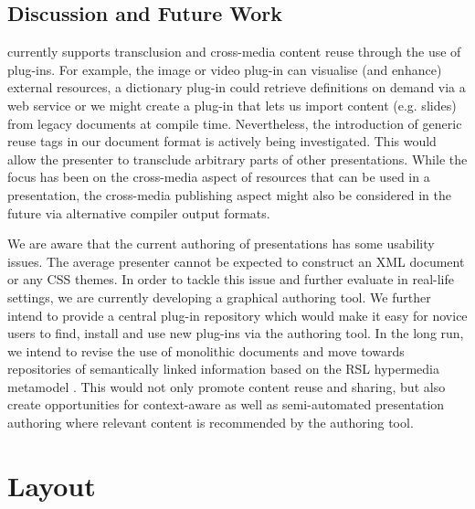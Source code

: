    \subsection{Discussion and Future Work}

    \mxp currently supports transclusion and cross-media content reuse through
    the use of plug-ins. For example, the image or video plug-in can visualise
    (and enhance) external resources, a dictionary plug-in could retrieve
    definitions on demand via a web service or we might create a plug-in that
    lets us import content (e.g. \ppt slides) from legacy documents at compile
    time. Nevertheless, the introduction of generic reuse tags in our document
    format is actively being investigated. This would allow the presenter to
    transclude arbitrary parts of other \mxp presentations. While the focus has
    been on the cross-media aspect of resources that can be used in a
    presentation, the cross-media publishing aspect might also be considered in
    the future via alternative compiler output formats.

    We are aware that the current authoring of \mxp presentations has some
    usability issues. The average presenter cannot be expected to construct an
    XML document or any CSS themes. In order to tackle this issue and further
    evaluate \mxp in real-life settings, we are currently developing a
    graphical \mxp authoring tool. We further intend to provide a central
    plug-in repository which would make it easy for novice users to find,
    install and use new plug-ins via the authoring tool. In the long run, we
    intend to revise the use of monolithic documents and move towards
    repositories of semantically linked information based on the RSL hypermedia
    metamodel \citep{signer-3}. This would not only promote content reuse and
    sharing, but also create opportunities for context-aware as well as
    semi-automated presentation authoring where relevant content is recommended
    by the authoring tool.

  \section{Layout}

